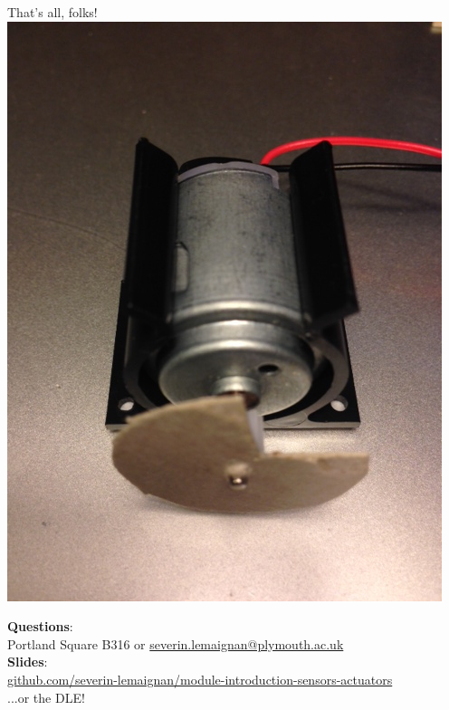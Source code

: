 \documentclass[compress]{beamer}
\makeatletter
\def\beamer@writeslidentry@miniframesoff{%
  \expandafter\beamer@ifempty\expandafter{\beamer@framestartpage}{}%
  {%
    \clearpage\beamer@notesactions%
  }
}
\newcommand*{\miniframesoff}{\let\beamer@writeslidentry=\beamer@writeslidentry@miniframesoff}
\makeatother
\begin{document}
\miniframesoff
\begin{frame}{}
    \begin{center}
        \Large
        That's all, folks!\\[2em]

            \includegraphics[width=0.25\linewidth]{encoder}

        \normalsize
        \textbf{Questions}:\\
        Portland Square B316 or \url{severin.lemaignan@plymouth.ac.uk} \\[1em]

        \textbf{Slides}:\\
        \href{https://github.com/severin-lemaignan/module-introduction-sensors-actuators}{\small
        github.com/severin-lemaignan/module-introduction-sensors-actuators} \\

        ...or the DLE!


    \end{center}
\end{frame}
\end{document}
